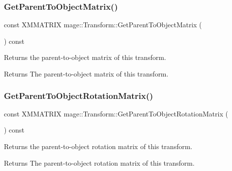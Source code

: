 \subsubsection{\texorpdfstring{Get\+Parent\+To\+Object\+Matrix()}{GetParentToObjectMatrix()}}
{\footnotesize\ttfamily const X\+M\+M\+A\+T\+R\+IX mage\+::\+Transform\+::\+Get\+Parent\+To\+Object\+Matrix (\begin{DoxyParamCaption}{ }\end{DoxyParamCaption}) const\hspace{0.3cm}{\ttfamily [noexcept]}}

Returns the parent-\/to-\/object matrix of this transform.

\begin{DoxyReturn}{Returns}
The parent-\/to-\/object matrix of this transform. 
\end{DoxyReturn}
\hypertarget{classmage_1_1_transform_a6aa076600f336e6635204a22abcdea69}{}\label{classmage_1_1_transform_a6aa076600f336e6635204a22abcdea69} 
\subsubsection{\texorpdfstring{Get\+Parent\+To\+Object\+Rotation\+Matrix()}{GetParentToObjectRotationMatrix()}}
{\footnotesize\ttfamily const X\+M\+M\+A\+T\+R\+IX mage\+::\+Transform\+::\+Get\+Parent\+To\+Object\+Rotation\+Matrix (\begin{DoxyParamCaption}{ }\end{DoxyParamCaption}) const\hspace{0.3cm}{\ttfamily [noexcept]}}

Returns the parent-\/to-\/object rotation matrix of this transform.

\begin{DoxyReturn}{Returns}
The parent-\/to-\/object rotation matrix of this transform. 
\end{DoxyReturn}
\hypertarget{classmage_1_1_transform_ab6da631ec399eb3b88b67e438dd0c002}{}\label{classmage_1_1_transform_ab6da631ec399eb3b88b67e438dd0c002} 
